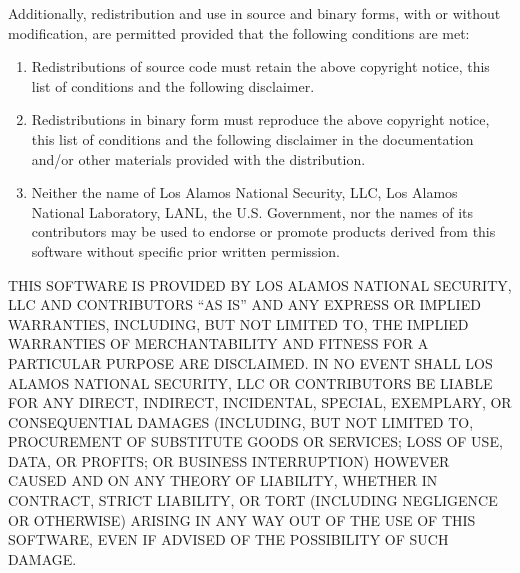 \documentclass[11pt,letterpaper]{article}
\begin{document}
Additionally, redistribution and use in source and binary forms, with
or without modification, are permitted provided that the following
conditions are met:

\begin{enumerate}
\item Redistributions of source code must retain the above copyright
   notice, this list of conditions and the following disclaimer.
\item Redistributions in binary form must reproduce the above
   copyright notice, this list of conditions and the following
   disclaimer in the documentation and/or other materials provided
   with the distribution.
\item Neither the name of Los Alamos National Security, LLC, Los Alamos
   National Laboratory, LANL, the U.S. Government, nor the names of its
   contributors may be used to endorse or promote products derived from
   this software without specific prior written permission.
\end{enumerate}

THIS SOFTWARE IS PROVIDED BY LOS ALAMOS NATIONAL SECURITY, LLC AND
CONTRIBUTORS ``AS IS'' AND ANY EXPRESS OR IMPLIED WARRANTIES, INCLUDING,
BUT NOT LIMITED TO, THE IMPLIED WARRANTIES OF MERCHANTABILITY AND FITNESS
FOR A PARTICULAR PURPOSE ARE DISCLAIMED. IN NO EVENT SHALL LOS ALAMOS
NATIONAL SECURITY, LLC OR CONTRIBUTORS BE LIABLE FOR ANY DIRECT,
INDIRECT, INCIDENTAL, SPECIAL, EXEMPLARY, OR CONSEQUENTIAL DAMAGES
(INCLUDING, BUT NOT LIMITED TO, PROCUREMENT OF SUBSTITUTE GOODS OR
SERVICES; LOSS OF USE, DATA, OR PROFITS; OR BUSINESS INTERRUPTION)
HOWEVER CAUSED AND ON ANY THEORY OF LIABILITY, WHETHER IN CONTRACT,
STRICT LIABILITY, OR TORT (INCLUDING NEGLIGENCE OR OTHERWISE) ARISING
IN ANY WAY OUT OF THE USE OF THIS SOFTWARE, EVEN IF ADVISED OF THE
POSSIBILITY OF SUCH DAMAGE.
\end{document}
